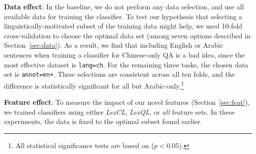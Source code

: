 \documentclass{sig-alternate-05-2015}
\newcommand{\red}[1]{\textcolor{red}{#1}}
\begin{document}
 

\textbf{Data effect}: In the baseline, we do not perform any data selection, and use all available data for training the
classifier. To test our hypothesis that selecting a linguistically-motivated subset of the training data
might help, we used 10-fold cross-validation to choose the optimal data set (among seven options described in 
Section~\ref{sec:data}). As a result, we find that including English or Arabic sentences when training a classifier 
for Chinese-only QA is a bad idea, since the most effective dataset is {\tt lang=ch}.
For the remaining three tasks, the chosen data set is {\tt annot=en+}.
These selections are consistent across all ten folds, and the difference is statistically significant for all but Arabic-only.\footnote{All 
statistical significance tests are based on \cite{Smucker:2007} ($p<0.05$).}


\textbf{Feature effect}: To measure the impact of our novel features (Section~\ref{sec:feat}), we trained classifiers using either
\emph{LexCL}, \emph{LexQL}, or \emph{all} feature sets. In these experiments, the data is fixed to the
optimal subset found earlier. 
\end{document}
